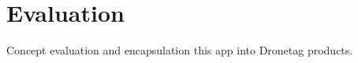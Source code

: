 \chapter{Evaluation}\label{ch:evaluation}
Concept evaluation and encapsulation this app into Dronetag products.